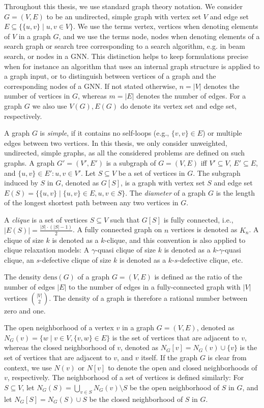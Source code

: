 \documentclass[draft,final]{vutinfth} %
\begin{document}
Throughout this thesis, we use standard graph theory notation. 
We consider $G = (V, E)$ to be an undirected, simple graph with vertex set $V$ and edge set $E \subseteq \{\{u,v\} \mid u,v \in V\}$. We use the terms vertex, vertices when denoting elements of $V$ in a graph $G$, and we use the terms node, nodes when denoting elements of a search graph or search tree corresponding to a search algorithm, e.g. in beam search, or nodes in a GNN. This distinction helps to keep formulations precise when for instance an algorithm that uses an internal graph structure is applied to a graph input, or to distinguish between vertices of a graph and the corresponding nodes of a GNN. 
If not stated otherwise, $n = |V|$ denotes the number of vertices in $G$, whereas $m = |E|$ denotes the number of edges. 
For a graph $G$ we also use $V(G), E(G)$ do denote its vertex set and edge set, respectively. 

A graph $G$ is \emph{simple}, if it contains no self-loops (e.g.,  $\{v,v\} \in E$) or multiple edges between two vertices. In this thesis, we only consider unweighted, undirected, simple graphs, as all the considered problems are defined on such graphs. 
A graph $G' = (V', E')$ is a subgraph of $G = (V,E)$ iff $V' \subseteq V$, $E' \subseteq E$, and $\{u,v\} \in E' \colon u,v \in V'$. Let $S \subseteq V$ be a set of vertices in $G$. The subgraph induced by $S$ in $G$, denoted as $G[S]$, is a graph with vertex set $S$ and edge set $E(S) = \{ \{u,v\} \mid \{u,v\} \in E, u,v \in S \}$. 
The \emph{diameter} of a graph $G$ is the length of the longest shortest path between any two vertices in $G$. 

A \emph{clique} is a set of vertices $S \subseteq V$ such that $G[S]$ is fully connected, i.e., $|E(S)| = \frac{|S| \cdot (|S|-1)}{2}$. A fully connected graph on $n$ vertices is denoted as $K_n$. A clique of size $k$ is denoted as a $k$-clique, and this convention is also applied to clique relaxation models: A $\gamma$-quasi clique of size $k$ is denoted as a $k$-$\gamma$-quasi clique, an $s$-defective clique of size $k$ is denoted as a $k$-$s$-defective clique, etc. 

The density $\mathrm{dens}(G)$ of a graph $G = (V,E)$ is defined as the ratio of the number of edges $|E|$ to the number of edges in a fully-connected graph with $|V|$ vertices $\binom{|V|}{2}$. 
The density of a graph is therefore a rational number between zero and one. 

The open neighborhood of a vertex $v$ in a graph $G = (V,E)$, denoted as $N_G(v) = \{ w \mid v \in V, \{v,w\} \in E\}$ is the set of vertices that are adjacent to $v$, whereas the closed neighborhood of $v$, denoted as $N_G[v] = N_G(v) \cup \{v\}$ is the set of vertices that are adjacent to $v$, and $v$ itself. 
If the graph $G$ is clear from context, we use $N(v)$ or $N[v]$ to denote the open and closed neighborhoods of $v$, respectively. 
The neighborhood of a set of vertices is defined similarly: For $S \subseteq V$, let $N_G(S) = \bigcup_{v \in S} N_G(v) \setminus S$ be the open neighborhood of $S$ in $G$, and let $N_G[S] = N_G(S) \cup S$ be the closed neighborhood of $S$ in $G$. 
\end{document}
